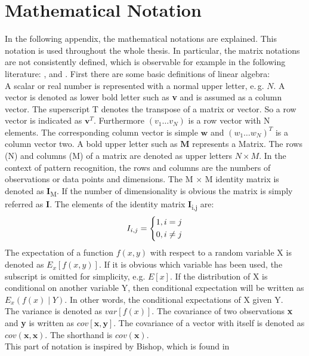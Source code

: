 \chapter{Mathematical Notation}\label{appaA}
In the following appendix, the mathematical notations are explained.
This notation is used throughout the whole thesis.
In particular, the matrix notations are not consistently defined, which is observable for example in the following literature: \cite{Chen.2009}, \cite{Bishop.2009} and \cite{Long.2015}.
First there are some basic definitions of linear algebra:\\
A scalar or real number is represented with a normal upper letter, e.\,g. $N$.
A vector is denoted as lower bold letter such as \textbf{v} and is assumed as a column vector.
The superscript T denotes the transpose of a matrix or vector. So a row vector is indicated as $\mathbf{v}^{T}$.
Furthermore $(v_1 \dots v_N)$ is a row vector with N elements.
The corresponding column vector is simple $\mathbf{w}$ and $(w_1 \dots w_N)^T$ is a column vector two.
A bold upper letter such as $\mathbf{M}$ represents a Matrix.
The rows (N) and columns (M) of a matrix are denoted as upper letters $N \times M$. 
In the context of pattern recognition, the rows and columns are the numbers of observations or data points and dimensions. 
The M $\times$ M identity matrix is denoted as \textbf{I}\textsubscript{M}.
If the number of dimensionality is obvious the matrix is simply referred as \textbf{I}.
The elements of the identity matrix \textbf{I}\textsubscript{i,j} are:
\[
I_{i,j}= \begin{dcases*}
1, i = j\\
0, i \neq j
\end{dcases*}
\]
The expectation of a function $f(x,y)$ with respect to a random variable X is denoted as $E_x[f(x,y)]$.
If it is obvious which variable has been used, the subscript is omitted for simplicity, e.g. $E[x]$.
If the distribution of X is conditional on another variable Y, then conditional expectation will be written as $E_x(f(x)\mid Y)$. In other words, the conditional expectations of X given Y.\\
The variance is denoted as $var[f(x)]$.
The covariance of two observations \textbf{x} and \textbf{y} is written as $cov[\textbf{x},\textbf{y}]$.
The covariance of a vector with itself is denoted as $cov(\textbf{x},\textbf{x})$. The shorthand is $cov(\textbf{x})$.\\
This part of notation is inspired by Bishop, which is found in \cite[p. xi - xii]{Bishop.2009}\\
